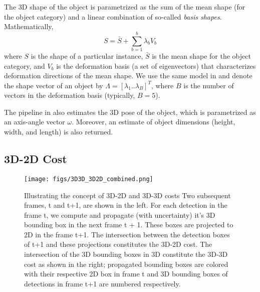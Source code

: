 \documentclass[letterpaper, 10 pt, conference]{ieeeconf}
\begin{document}
The 3D shape of the object is parametrized as the sum of the mean shape (for the object category) and a linear combination of so-called \emph{basis shapes}. Mathematically, 
\begin{equation}
S = \bar{S} + \sum_{b=1}^b \lambda_b V_b
\end{equation}
where $S$ is the shape of a particular instance, $\bar{S}$ is the mean shape for the object category, and $V_b$ is the deformation basis (a set of eigenvectors) that characterizes deformation directions of the mean shape. We use the same model in \cite{KM_ICRA} and denote the shape vector of an object by $\Lambda = \left[\lambda_1 .. \lambda_B\right]^T$, where $B$ is the number of vectors in the deformation basis (typically, $B = 5$). 

The pipeline in \cite{KM_ICRA} also estimates the 3D pose of the object, which is parametrized as an axis-angle vector $\omega$. Moreover, an estimate of object dimensions (height, width, and length) is also returned.


\subsection{3D-2D Cost}

\begin{figure}[!t]
  \centering
  \texttt{[image: figs/3D3D\_3D2D\_combined.png]}
  \caption{Illustrating the concept of 3D-2D and 3D-3D costs Two subsequent frames, t and t+1, are shown in the left. For each detection in the frame t, we compute and propagate (with uncertainty) it’s 3D bounding box in the next frame t + 1. These boxes are projected to 2D in the frame t+1. The intersection between the detection boxes of t+1 and these projections constitutes the 3D-2D cost. The intersection of the 3D bounding boxes in 3D constitute the 3D-3D cost as shown in the right; propagated bounding boxes are colored with their respective 2D box in frame t and 3D bounding boxes of  detections in frame t+1 are numbered respectively.}
  \label{fig:3d2d}
\end{figure}
\end{document}
